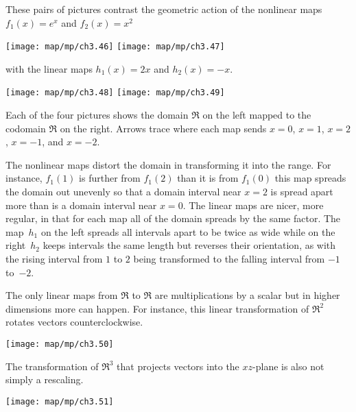 These pairs of pictures contrast the geometric action of the nonlinear maps
\( f_1(x)=e^x \) and \( f_2(x)=x^2 \) 
\begin{center}
  \texttt{[image: map/mp/ch3.46]}
  \hspace*{4em}
  \texttt{[image: map/mp/ch3.47]}
\end{center}
with the linear maps
\( h_1(x)=2x \) and \( h_2(x)=-x \).
\begin{center}
  \texttt{[image: map/mp/ch3.48]}
  \hspace*{4em}
  \texttt{[image: map/mp/ch3.49]}
\end{center}
Each of the four pictures shows the domain $\Re$ on the left 
mapped to the codomain $\Re$ on the right. 
Arrows trace where each map sends
$x=0$, $x=1$, $x=2$, $x=-1$, and $x=-2$.

The nonlinear maps distort
the domain in transforming it into the range.
For instance,
\( f_1(1) \) is further from
$f_1(2)$ than it is from $f_1(0)$ \Dash  this map spreads
the domain out unevenly so that a domain interval near $x=2$ is 
spread apart more 
than is a domain interval near $x=0$.
The linear maps are nicer, more regular, 
in that for each map all of the domain 
spreads by the same factor.
The map~$h_1$ on the left spreads all intervals apart to be twice as wide 
while on the right~$h_2$ keeps intervals the same length but reverses
their orientation, as with the rising interval from $1$ to $2$ 
being transformed 
to the falling interval from $-1$ to~$-2$.

The only linear maps from $\Re$ to $\Re$ are multiplications by a scalar but
in higher dimensions more can happen. 
For instance, this linear transformation of $\Re^2$
rotates vectors counterclockwise.
\begin{center}
  \texttt{[image: map/mp/ch3.50]}
\end{center}
The transformation of $\Re^3$ 
that projects vectors into the $xz$-plane
is also not simply a rescaling.
\begin{center}
 \texttt{[image: map/mp/ch3.51]}
\end{center}

